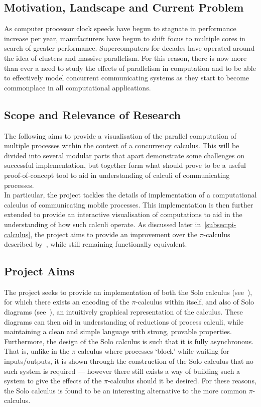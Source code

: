 \subsection{Motivation, Landscape and Current Problem}

    As computer processor clock speeds have begun to stagnate in performance increase per year, manufacturers have begun to shift focus to multiple cores in search of greater performance.
    Supercomputers for decades have operated around the idea of clusters and massive parallelism.
    For this reason, there is now more than ever a need to study the effects of parallelism in computation and to be able to effectively model concurrent communicating systems as they start to become commonplace in all computational applications.


\subsection{Scope and Relevance of Research}

    The following aims to provide a visualisation of the parallel computation of multiple processes within the context of a concurrency calculus.
    This will be divided into several modular parts that apart demonstrate some challenges on successful implementation, but together form what should prove to be a useful proof-of-concept tool to aid in understanding of calculi of communicating processes.\\

    In particular, the project tackles the details of implementation of a computational calculus of communicating mobile processes.
    This implementation is then further extended to provide an interactive visualisation of computations to aid in the understanding of how such calculi operate.
    As discussed later in~\ref{subsec:pi-calculus}, the project aims to provide an improvement over the $\pi$-calculus described by~\cite{pi-calculus}, while still remaining functionally equivalent.


\subsection{Project Aims}

    The project seeks to provide an implementation of both the Solo calculus (see~\cite{solo-calculus}), for which there exists an encoding of the $\pi$-calculus within itself, and also of Solo diagrams (see~\cite{solo-diagrams}), an intuitively graphical representation of the calculus.
    These diagrams can then aid in understanding of reductions of process calculi, while maintaining a clean and simple language with strong, provable properties.
    Furthermore, the design of the Solo calculus is such that it is fully asynchronous.
    That is, unlike in the $\pi$-calculus where processes ‘block’ while waiting for inputs/outputs, it is shown through the construction of the Solo calculus that no such system is required — however there still exists a way of building such a system to give the effects of the $\pi$-calculus should it be desired.
    For these reasons, the Solo calculus is found to be an interesting alternative to the more common $\pi$-calculus.


